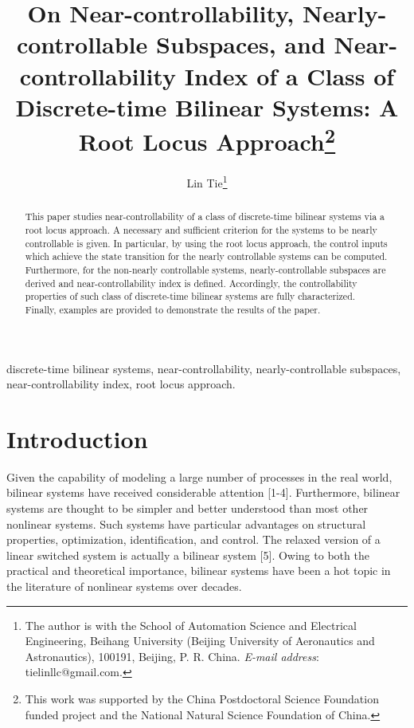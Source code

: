 \documentclass[journal,a4paper,12pt,onecolumn]{IEEEtran}
\begin{document}
\title{On Near-controllability, Nearly-controllable Subspaces, and
Near-controllability Index of a Class of Discrete-time Bilinear Systems: A
Root Locus Approach\thanks{This work was supported by the China Postdoctoral Science Foundation funded
project and the National Natural Science Foundation of China.}}
\author{Lin Tie\thanks{The author is with the School of Automation Science and Electrical
Engineering, Beihang University (Beijing University of Aeronautics and
Astronautics), 100191, Beijing, P. R. China. \textit{E-mail address}:
tielinllc@gmail.com.}}
\maketitle

\begin{abstract}
This paper studies near-controllability of a class of discrete-time bilinear
systems via a root locus approach. A necessary and sufficient criterion for
the systems to be nearly controllable is given. In particular, by using the
root locus approach, the control inputs which achieve the state transition
for the nearly controllable systems can be computed. Furthermore, for the
non-nearly controllable systems, nearly-controllable subspaces are derived
and near-controllability index is defined. Accordingly, the controllability
properties of such class of discrete-time bilinear systems are fully
characterized. Finally, examples are provided to demonstrate the results of
the paper.
\end{abstract}

\begin{keywords}
discrete-time bilinear systems, near-controllability, nearly-controllable
subspaces, near-controllability index, root locus approach.
\end{keywords}

\section{Introduction}

Given the capability of modeling a large number of processes in the real
world, bilinear systems have received considerable attention [1-4].
Furthermore, bilinear systems are thought to be simpler and better
understood than most other nonlinear systems. Such systems have particular
advantages on structural properties, optimization, identification, and
control. The relaxed version of a linear switched system is actually a
bilinear system [5]. Owing to both the practical and theoretical importance,
bilinear systems have been a hot topic in the literature of nonlinear
systems over decades.
\end{document}
